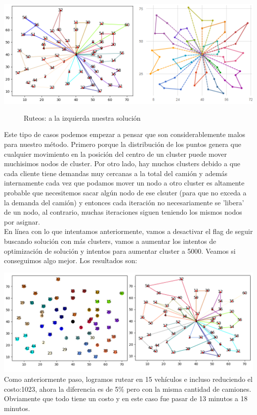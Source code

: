 \documentclass[11pt,a4paper]{article}
\begin{document}
\includegraphics[scale=.5]{graficos/P-n60-k15/caminos.png}
\begin{figure}[!h]
\caption{Ruteos: a la izquierda nuestra solución}
\end{figure}

Este tipo de casos podemos empezar a pensar que son considerablemente malos para nuestro método. Primero porque la distribución de los puntos genera que cualquier movimiento en la posición del centro de un cluster puede mover muchisimos nodos de cluster. Por otro lado, hay muchos clusters debido a que cada cliente tiene demandas muy cercanas a la total del camión y además internamente cada vez que podamos mover un nodo a otro cluster es altamente probable que necesitemos sacar algún nodo de ese clsuter (para que no exceda a la demanda del camión) y entonces cada iteración no necesariamente se 'libera' de un nodo, al contrario, muchas iteraciones siguen teniendo los mismos nodos por asignar.\\


En línea con lo que intentamos anteriormente, vamos a desactivar el flag de seguir buscando solución con más clusters, vamos a aumentar los intentos de optimización de solución y intentos para aumentar cluster a 5000. Veamos si conseguimos algo mejor. Los resultados son: 

\bigskip
\includegraphics[scale=.5]{graficos/P-n60-k15/cluster-caminos2.png}
Como anteriormente paso, logramos rutear en 15 vehículos e incluso reduciendo el costo:1023, ahora la diferencia es de 5\% pero con la misma cantidad de camiones. Obviamente que todo tiene un costo y en este caso fue pasar de 13 minutos a 18 minutos.
\end{document}
